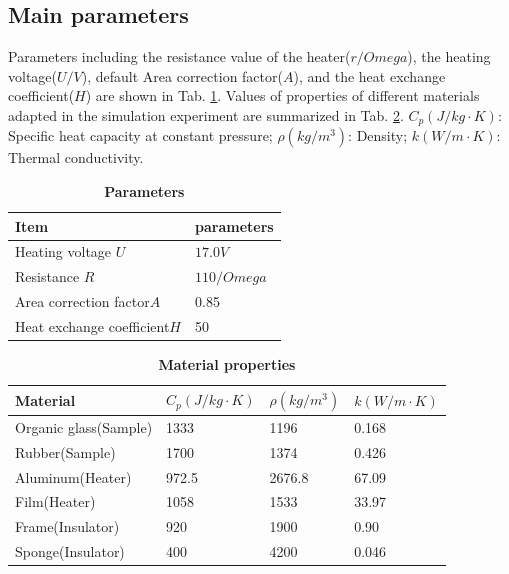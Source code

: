 \documentclass[12pt,a4paper,UTF8]{article}
\begin{document}
    \subsection{Main parameters}
    Parameters including the resistance value of the heater($r /Omega$), the heating voltage($U/V$), 
    default Area correction factor($A$), and the heat exchange coefficient($H$) are shown in Tab. \ref{tab.s2.1}. 
    Values of properties of different materials adapted in the simulation experiment are summarized in Tab. \ref{tab.s2.2}. 
    $C_p (J/kg\cdot K)$: Specific heat capacity at constant pressure; $\rho (kg/m^3)$: Density; $k (W/m\cdot K)$: Thermal conductivity.
    
    \begin{table}[htbp]
        \centering
        \caption{\textbf{Parameters}}
        \label{tab.s2.1}
            \begin{tabular}{ll}
                \toprule
                Item &parameters  \\
                \midrule
                Heating voltage $U$ &$17.0V$ \\
                Resistance $R$ &$110 /Omega$ \\
                Area correction factor$A$ &0.85 \\
                Heat exchange coefficient$H$ &50 \\
                \bottomrule
            \end{tabular}
    \end{table}	

    \begin{table}[htbp]
        \centering
        \caption{\textbf{Material properties}}
        \label{tab.s2.2}
            \begin{tabular}{llll}
                \toprule
                Material &$C_p (J/kg\cdot K)$    &$\rho (kg/m^3)$   &$k (W/m\cdot K)$  \\
                \midrule
                Organic glass(Sample) &1333    &1196    &0.168  \\
                Rubber(Sample) &1700    &1374   &0.426  \\
                Aluminum(Heater) &972.5    &2676.8    &67.09  \\
                Film(Heater) &1058    &1533    &33.97  \\
                Frame(Insulator) &920    &1900    &0.90  \\
                Sponge(Insulator) &400    &4200    &0.046  \\
                \bottomrule
            \end{tabular}
    \end{table}	
\end{document}
